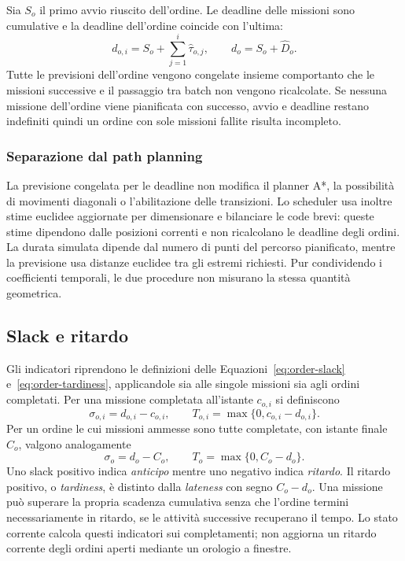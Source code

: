 Sia $S_o$ il primo avvio riuscito dell'ordine. Le deadline delle missioni
sono cumulative e la deadline dell'ordine coincide con l'ultima:
\begin{equation}
    d_{o,i}=S_o+\sum_{j=1}^{i}\widehat\tau_{o,j},
    \qquad d_o=S_o+\widehat D_o.
    \label{eq:estimated-order-deadline}
\end{equation}
Tutte le previsioni dell'ordine vengono congelate insieme comportanto che le missioni
successive e il passaggio tra batch non vengono ricalcolate. Se nessuna missione
dell'ordine viene pianificata con successo, avvio e deadline restano
indefiniti quindi un ordine con sole missioni fallite risulta incompleto.


\subsubsection{Separazione dal path planning}
La previsione congelata per le deadline non modifica il planner A*,
la possibilità di movimenti diagonali o l'abilitazione delle transizioni.
Lo scheduler usa inoltre stime euclidee aggiornate per dimensionare e
bilanciare le code brevi: queste stime dipendono dalle posizioni correnti
e non ricalcolano le deadline degli ordini. La durata simulata dipende dal
numero di punti del percorso pianificato, mentre la previsione usa distanze
euclidee tra gli estremi richiesti. Pur condividendo i coefficienti temporali,
le due procedure non misurano la stessa quantità geometrica.


\subsection{Slack e ritardo}

Gli indicatori riprendono le definizioni delle
Equazioni~\ref{eq:order-slack} e~\ref{eq:order-tardiness}, applicandole
sia alle singole missioni sia agli ordini completati. Per una missione completata all'istante $c_{o,i}$ si definiscono
\begin{equation}
    \sigma_{o,i}=d_{o,i}-c_{o,i},\qquad
    T_{o,i}=\max\{0,c_{o,i}-d_{o,i}\}.
\end{equation}
Per un ordine le cui missioni ammesse sono tutte completate, con istante
finale $C_o$, valgono analogamente
\begin{equation}
    \sigma_o=d_o-C_o,\qquad T_o=\max\{0,C_o-d_o\}.
\end{equation}
Uno slack positivo indica \textit{anticipo} mentre uno negativo indica \textit{ritardo}.
Il ritardo positivo, o \textit{tardiness}, è distinto dalla
\textit{lateness} con segno $C_o-d_o$. Una missione può superare la propria
scadenza cumulativa senza che l'ordine termini necessariamente in ritardo,
se le attività successive recuperano il tempo. Lo stato corrente calcola
questi indicatori sui completamenti; non aggiorna un ritardo corrente degli
ordini aperti mediante un orologio a finestre.


